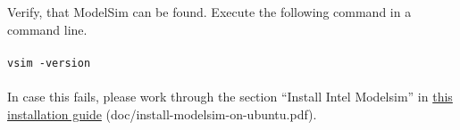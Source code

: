 Verify, that ModelSim can be found. Execute the following command in a command line.\\
\\
\texttt{vsim -version}\\
\\
In case this fails, please work through the section ``Install Intel Modelsim''
in \href{../install-modelsim-on-ubuntu.pdf}{this installation guide} (doc/install-modelsim-on-ubuntu.pdf).

\newpage
